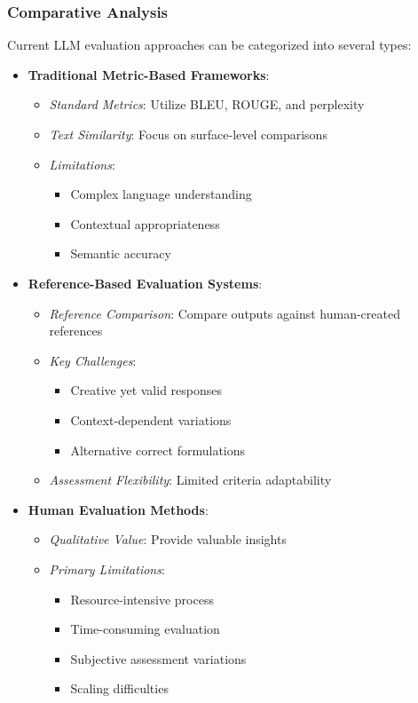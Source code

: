\subsubsection{Comparative Analysis}
Current LLM evaluation approaches can be categorized into several types:

\begin{itemize}
    \item \textbf{Traditional Metric-Based Frameworks}:
    \begin{itemize}
        \item \textit{Standard Metrics}: Utilize BLEU, ROUGE, and perplexity
        \item \textit{Text Similarity}: Focus on surface-level comparisons
        \item \textit{Limitations}:
        \begin{itemize}
            \item Complex language understanding
            \item Contextual appropriateness
            \item Semantic accuracy
        \end{itemize}
    \end{itemize}
    
    \item \textbf{Reference-Based Evaluation Systems}:
    \begin{itemize}
        \item \textit{Reference Comparison}: Compare outputs against human-created references
        \item \textit{Key Challenges}:
        \begin{itemize}
            \item Creative yet valid responses
            \item Context-dependent variations
            \item Alternative correct formulations
        \end{itemize}
        \item \textit{Assessment Flexibility}: Limited criteria adaptability
    \end{itemize}
    
    \item \textbf{Human Evaluation Methods}:
    \begin{itemize}
        \item \textit{Qualitative Value}: Provide valuable insights
        \item \textit{Primary Limitations}:
        \begin{itemize}
            \item Resource-intensive process
            \item Time-consuming evaluation
            \item Subjective assessment variations
            \item Scaling difficulties
        \end{itemize}
    \end{itemize}
\end{itemize}

